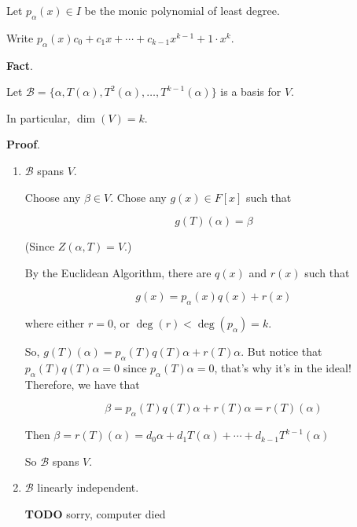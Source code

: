 \documentclass[12pt]{article}
\def\B{\mathcal B}
\newcommand{\TODO}{\color{red}\textbf{TODO}\color{black}}
\begin{document}
  Let $p_\alpha(x) \in I$ be the monic polynomial of least degree.

  Write $p_\alpha(x) c_0 + c_1 x + \cdots + c_{k - 1} x^{k - 1} + 1 \cdot x^k$.

  {\bf Fact}.

  Let $\B = \{\alpha, T(\alpha), T^2(\alpha), \dots, T^{k - 1}(\alpha)\}$ is a
  basis for $V$.

  In particular, $\dim(V) = k$.

  {\bf Proof}.

  \begin{enumerate}
    \item $\B$ spans $V$.

      Choose any $\beta \in V$. Chose any $g(x) \in F[x]$ such that

      \[
        g(T)(\alpha) = \beta
      \]

      (Since $Z(\alpha, T) = V$.)

      By the Euclidean Algorithm, there are $q(x)$ and $r(x)$ such that

      \[
        g(x) = p_\alpha(x) q(x) + r(x)
      \]

      where either $r = 0$, or $\deg(r) < \deg(p_\alpha) = k$.

      So, $g(T)(\alpha) = p_\alpha(T) q(T) \alpha + r(T) \alpha$. But notice
      that $p_\alpha(T) q(T) \alpha = 0$ since $p_\alpha(T) \alpha = 0$, that's
      why it's in the ideal! Therefore, we have that

      \[
        \beta = p_\alpha(T) q(T) \alpha + r(T) \alpha = r(T)(\alpha)
      \]

      Then $\beta = r(T)(\alpha) = d_0 \alpha + d_1 T(\alpha) + \cdots + d_{k -
      1} T^{k - 1}(\alpha)$

      So $\B$ spans $V$.

    \item $\B$ linearly independent.

      \TODO{} sorry, computer died

  \end{enumerate}
\end{document}
